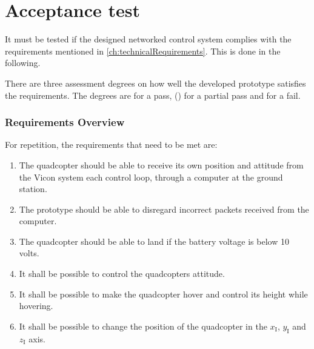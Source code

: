 \chapter{Acceptance test}

It must be tested if the designed networked control system complies with the requirements mentioned in \autoref{ch:technicalRequirements}. This is done in the following. %

There are three assessment degrees on how well the developed prototype satisfies the requirements. The degrees are  for a pass, () for a partial pass and  for a fail. 

\subsection*{Requirements Overview}
For repetition, the requirements that need to be met are:
\begin{enumerate}[label=\textbf{\arabic*})]
\item {The quadcopter should be able to receive its own position and attitude from the Vicon system each control loop, through a computer at the ground station.}
\item {The prototype should be able to disregard incorrect packets received from the computer.}
\item {The quadcopter should be able to land if the battery voltage is below 10 volts.}
\item {It shall be possible to control the quadcopters attitude.}
\item {It shall be possible to make the quadcopter hover and control its height while hovering.}
\item {It shall be possible to change the position of the quadcopter in the $x_{\mathrm{I}}$, $y_{\mathrm{I}}$ and $z_{\mathrm{I}}$ axis.}
\end{enumerate}

\newpage
